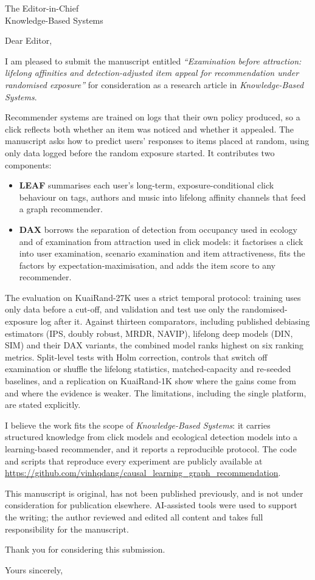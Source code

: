 \documentclass[11pt]{letter}
\date{\today}
\begin{document}
\begin{letter}{The Editor-in-Chief\\Knowledge-Based Systems}
\opening{Dear Editor,}

I am pleased to submit the manuscript entitled \emph{``Examination before attraction: lifelong affinities and detection-adjusted item appeal for recommendation under randomised exposure''} for consideration as a research article in \emph{Knowledge-Based Systems}.

Recommender systems are trained on logs that their own policy produced, so a click reflects both whether an item was noticed and whether it appealed. The manuscript asks how to predict users' responses to items placed at random, using only data logged before the random exposure started. It contributes two components:
\begin{itemize}
\item \textbf{LEAF} summarises each user's long-term, exposure-conditional click behaviour on tags, authors and music into lifelong affinity channels that feed a graph recommender.
\item \textbf{DAX} borrows the separation of detection from occupancy used in ecology and of examination from attraction used in click models: it factorises a click into user examination, scenario examination and item attractiveness, fits the factors by expectation-maximisation, and adds the item score to any recommender.
\end{itemize}

The evaluation on KuaiRand-27K uses a strict temporal protocol: training uses only data before a cut-off, and validation and test use only the randomised-exposure log after it. Against thirteen comparators, including published debiasing estimators (IPS, doubly robust, MRDR, NAVIP), lifelong deep models (DIN, SIM) and their DAX variants, the combined model ranks highest on six ranking metrics. Split-level tests with Holm correction, controls that switch off examination or shuffle the lifelong statistics, matched-capacity and re-seeded baselines, and a replication on KuaiRand-1K show where the gains come from and where the evidence is weaker. The limitations, including the single platform, are stated explicitly.

I believe the work fits the scope of \emph{Knowledge-Based Systems}: it carries structured knowledge from click models and ecological detection models into a learning-based recommender, and it reports a reproducible protocol. The code and scripts that reproduce every experiment are publicly available at \url{https://github.com/vinhqdang/causal_learning_graph_recommendation}.

This manuscript is original, has not been published previously, and is not under consideration for publication elsewhere. AI-assisted tools were used to support the writing; the author reviewed and edited all content and takes full responsibility for the manuscript.

Thank you for considering this submission.

\closing{Yours sincerely,}
\end{letter}
\end{document}
